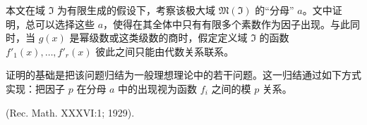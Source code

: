 \documentclass[11pt]{article}
\begin{document}
本文在域 $\mathfrak{I}$ 为有限生成的假设下，考察该极大域 $\mathfrak{M}(\mathfrak{I})$ 的“分母” $a$。文中证明，总可以选择这些 $a$，使得在其全体中只有有限多个素数作为因子出现。与此同时，当 $g(x)$ 是幂级数或这类级数的商时，假定定义域 $\mathfrak{I}$ 的函数 $f'_1(x),\ldots,f'_r(x)$ 彼此之间只能由代数关系联系。

证明的基础是把该问题归结为一般理想理论中的若干问题。这一归结通过如下方式实现：把因子 $p$ 在分母 $a$ 中的出现视为函数 $f_i$ 之间的模 $p$ 关系。

\begin{center}
(Rec. Math. XXXVI:1; 1929).
\end{center}
\endgroup

\setcounter{footnote}{0}
\clearpage
\end{document}
